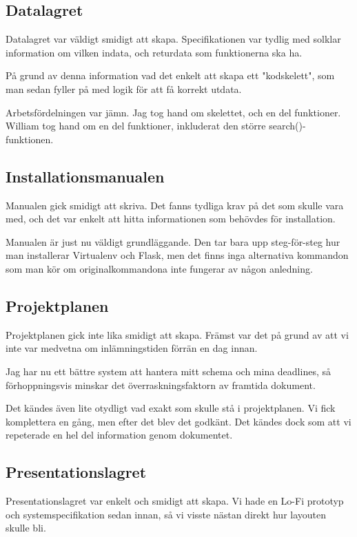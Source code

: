 \documentclass{TDP003mall}
\begin{document}
\subsection{Datalagret}
Datalagret var väldigt smidigt att skapa. Specifikationen var tydlig med solklar information om vilken indata, och returdata som funktionerna ska ha.

På grund av denna information vad det enkelt att skapa ett "kodskelett", som man sedan fyller på med logik för att få korrekt utdata.

Arbetsfördelningen var jämn. Jag tog hand om skelettet, och en del funktioner. William tog hand om en del funktioner, inkluderat den större search()-funktionen.

\subsection{Installationsmanualen}
Manualen gick smidigt att skriva. Det fanns tydliga krav på det som skulle vara med, och det var enkelt att hitta informationen som behövdes för installation.

Manualen är just nu väldigt grundläggande. Den tar bara upp steg-för-steg hur man installerar Virtualenv och Flask, men det finns inga alternativa kommandon som man kör om originalkommandona inte fungerar av någon anledning.

\subsection{Projektplanen}
Projektplanen gick inte lika smidigt att skapa. Främst var det på grund av att vi inte var medvetna om inlämningstiden förrän en dag innan.

Jag har nu ett bättre system att hantera mitt schema och mina deadlines, så förhoppningsvis minskar det överraskningsfaktorn av framtida dokument.

Det kändes även lite otydligt vad exakt som skulle stå i projektplanen. Vi fick komplettera en gång, men efter det blev det godkänt. Det kändes dock som att vi repeterade en hel del information genom dokumentet.

\subsection{Presentationslagret}
Presentationslagret var enkelt och smidigt att skapa. Vi hade en Lo-Fi prototyp och systemspecifikation sedan innan, så vi visste nästan direkt hur layouten skulle bli.
\end{document}
